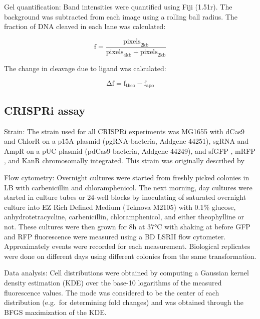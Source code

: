 \documentclass[10pt,oneside]{article}
\begin{document}
Gel quantification: Band intensities were quantified using Fiji (1.51r).  The 
background was subtracted from each image using a  rolling ball radius.  
The fraction of DNA cleaved in each lane was calculated:

\begin{displaymath}
 \mathrm{f} = \frac{\mathrm{pixels}_\mathrm{2kb}}{\mathrm{pixels}_\mathrm{4kb} 
 + \mathrm{pixels}_\mathrm{2kb}}
\end{displaymath}

The change in cleavage due to ligand was calculated: 

\begin{displaymath}
 \mathrm{Δf} = \mathrm{f}_\mathrm{theo} - \mathrm{f}_\mathrm{apo}
\end{displaymath}

\subsection{CRISPRi assay}

Strain: The strain used for all CRISPRi experiments was \ecoli{} MG1655 with 
dCas9 and ChlorR on a p15A plasmid (pgRNA-bacteria, Addgene 44251), sgRNA and 
AmpR on a pUC plasmid (pdCas9-bacteria, Addgene 44249), and sfGFP 
\autocite{pedelacq2006}, mRFP \autocite{campbell2002}, and KanR chromosomally 
integrated.  This strain was originally described by 

Flow cytometry: Overnight cultures were started from freshly picked colonies in 
 LB with  carbenicillin and  chloramphenicol.  The 
next morning, day cultures were started in  culture tubes or 24-well 
blocks by inoculating  of saturated overnight culture into  EZ Rich 
Defined Medium (Teknova M2105) with 0.1\% glucose,  
an\-hydro\-tetra\-cycline,  carbenicillin,  chloramphenicol, 
and either  theophylline or not.  These cultures were then grown for 8h 
at 37°C with shaking at  before GFP and RFP fluorescence were measured 
using a BD LSRII flow cytometer.  Approximately \unit[10,000]{events} were 
recorded for each measurement.  Biological replicates were done on different 
days using different colonies from the same transformation.

Data analysis: Cell distributions were obtained by computing a Gaussian kernel 
density estimation (KDE) over the base-10 logarithms of the measured 
fluorescence values.  The mode was considered to be the center of each 
distribution (e.g.\ for determining fold changes) and was obtained through the 
BFGS maximization of the KDE.
\end{document}
